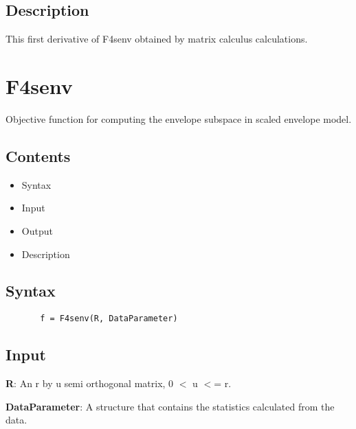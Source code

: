 \documentclass[a4paper,11pt,openany]{memoir}
\begin{document}
\subsection*{Description}

\begin{par}
This first derivative of F4senv obtained by matrix calculus calculations.
\end{par} \vspace{1em}

\newpage

\rmfamily
\color{black}\section{F4senv}

\begin{par}
Objective function for computing the envelope subspace in scaled envelope model.
\end{par} \vspace{1em}

\subsection*{Contents}

\begin{itemize}
\setlength{\itemsep}{-1ex}
   \item Syntax
   \item Input
   \item Output
   \item Description
\end{itemize}


\subsection*{Syntax}


\begin{verbatim}       f = F4senv(R, DataParameter)\end{verbatim}
    

\subsection*{Input}

\begin{par}
\textbf{R}: An r by u semi orthogonal matrix, 0 \ensuremath{<} u \ensuremath{<}= r.
\end{par} \vspace{1em}
\begin{par}
\textbf{DataParameter}: A structure that contains the statistics calculated from the data.
\end{par} \vspace{1em}
\end{document}
